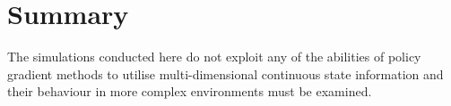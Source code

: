 \section{Summary}
The simulations conducted here do not exploit any of
the abilities of policy gradient methods to utilise multi-dimensional
continuous state information and their behaviour in more complex environments
must be examined.



%
%
%
